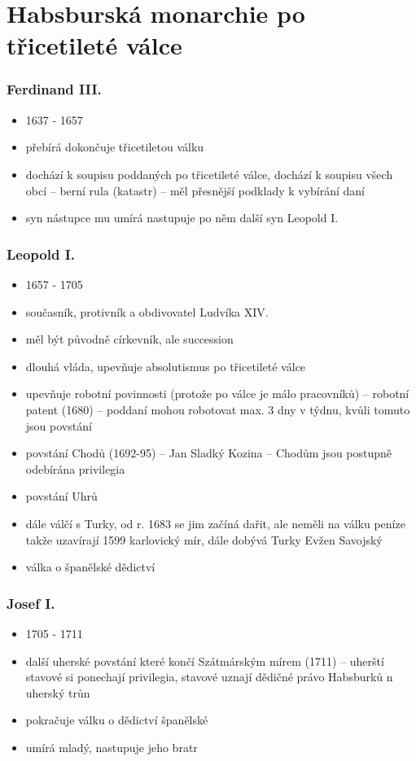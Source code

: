\documentclass{article}
\begin{document}
\part{Habsburská monarchie po třicetileté válce}

\section{Ferdinand III.}
\begin{itemize}
  \item 1637 - 1657
  \item přebírá dokončuje třicetiletou válku
  \item dochází k soupisu poddaných po třicetileté válce, dochází k soupisu všech obcí -- berní rula (katastr) -- měl přesnější podklady k vybírání daní
  \item syn nástupce mu umírá nastupuje po něm další syn Leopold I.
\end{itemize}

\section{Leopold I.}
\begin{itemize}
  \item 1657 - 1705
  \item současník, protivník a obdivovatel Ludvíka XIV.
  \item měl být původně církevník, ale succession
  \item dlouhá vláda, upevňuje absolutismus po třicetileté válce
  \item upevňuje robotní povinnosti (protože po válce je málo pracovníků) -- robotní patent (1680) -- poddaní mohou robotovat max. 3 dny v týdnu, kvůli tomuto jsou povstání
  \item povstání Chodů (1692-95) -- Jan Sladký Kozina -- Chodům jsou postupně odebírána privilegia
  \item povstání Uhrů
  \item dále válčí s Turky, od r. 1683 se jim začíná dařit, ale neměli na válku peníze takže uzavírají 1599 karlovický mír, dále dobývá Turky Evžen Savojský
  \item válka o španělské dědictví
\end{itemize}

\section{Josef I.}
\begin{itemize}
  \item 1705 - 1711
  \item další uherské povstání které končí Szátmárským mírem (1711) -- uherští stavové si ponechají privilegia, stavové uznají dědičné právo Habsburků n uherský trůn
  \item pokračuje válku o dědictví španělské
  \item umírá mladý, nastupuje jeho bratr
\end{itemize}
\end{document}
